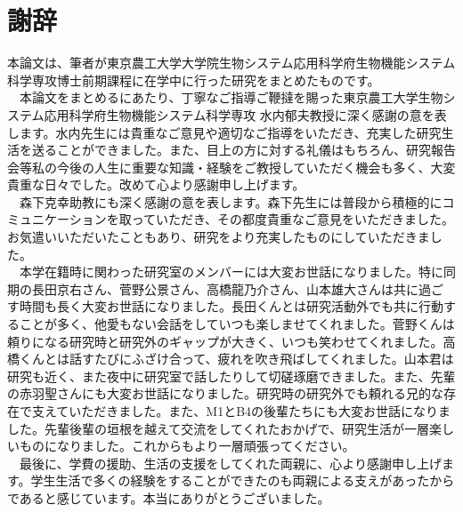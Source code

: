 \chapter*{謝辞}
本論文は、筆者が東京農工大学大学院生物システム応用科学府生物機能システム科学専攻博士前期課程に在学中に行った研究をまとめたものです。\\
　本論文をまとめるにあたり、丁寧なご指導ご鞭撻を賜った東京農工大学生物システム応用科学府生物機能システム科学専攻 水内郁夫教授に深く感謝の意を表します。水内先生には貴重なご意見や適切なご指導をいただき、充実した研究生活を送ることができました。また、目上の方に対する礼儀はもちろん、研究報告会等私の今後の人生に重要な知識・経験をご教授していただく機会も多く、大変貴重な日々でした。改めて心より感謝申し上げます。\\
　森下克幸助教にも深く感謝の意を表します。森下先生には普段から積極的にコミュニケーションを取っていただき、その都度貴重なご意見をいただきました。お気遣いいただいたこともあり、研究をより充実したものにしていただきました。\\
　本学在籍時に関わった研究室のメンバーには大変お世話になりました。特に同期の長田京右さん、菅野公景さん、高橋龍乃介さん、山本雄大さんは共に過ごす時間も長く大変お世話になりました。長田くんとは研究活動外でも共に行動することが多く、他愛もない会話をしていつも楽しませてくれました。菅野くんは頼りになる研究時と研究外のギャップが大きく、いつも笑わせてくれました。高橋くんとは話すたびにふざけ合って、疲れを吹き飛ばしてくれました。山本君は研究も近く、また夜中に研究室で話したりして切磋琢磨できました。また、先輩の赤羽聖さんにも大変お世話になりました。研究時の研究外でも頼れる兄的な存在で支えていただきました。また、M1とB4の後輩たちにも大変お世話になりました。先輩後輩の垣根を越えて交流をしてくれたおかげで、研究生活が一層楽しいものになりました。これからもより一層頑張ってください。\\
　最後に、学費の援助、生活の支援をしてくれた両親に、心より感謝申し上げます。学生生活で多くの経験をすることができたのも両親による支えがあったからであると感じています。本当にありがとうございました。

